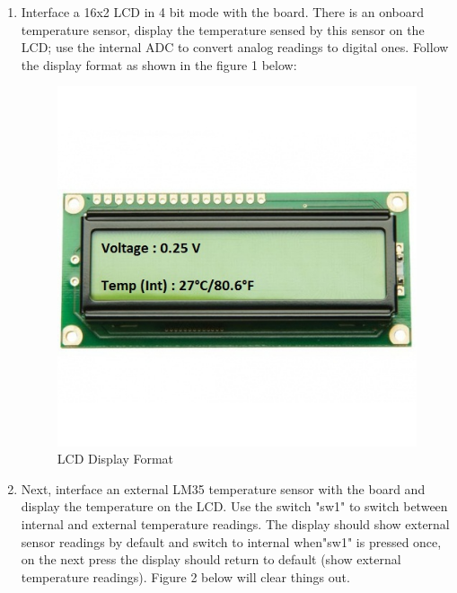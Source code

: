 \documentclass{article} %
\begin{document}
\begin{enumerate}
\item 
Interface a 16x2 LCD in 4 bit mode with the board. There is an onboard temperature sensor, display the temperature sensed by this sensor on the LCD; use the internal ADC to convert analog readings to digital ones.
\newline
Follow the display format as shown in the figure 1 below:
\begin{figure}
\centering
\includegraphics[scale=0.4]{16-2-lcd-backlight-green-2-500x500.jpg}
\caption{LCD Display Format}
\end{figure}
\item
Next, interface an external LM35 temperature sensor with the board and display the temperature on the LCD. Use the switch "sw1" to switch between internal and external temperature readings. The display should show external sensor readings by default and switch to internal when"sw1" is pressed once, on the next press the display should return to default (show external temperature readings). Figure 2 below will clear things out. 
\end{enumerate}
\end{document}
